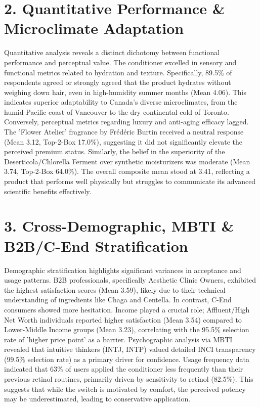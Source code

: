 \documentclass[10pt,twocolumn,a4paper]{article}
\begin{document}
\section{2. Quantitative Performance \& Microclimate Adaptation}
Quantitative analysis reveals a distinct dichotomy between functional performance and perceptual value. The conditioner excelled in sensory and functional metrics related to hydration and texture. Specifically, 89.5\% of respondents agreed or strongly agreed that the product hydrates without weighing down hair, even in high-humidity summer months (Mean 4.06). This indicates superior adaptability to Canada's diverse microclimates, from the humid Pacific coast of Vancouver to the dry continental cold of Toronto. Conversely, perceptual metrics regarding luxury and anti-aging efficacy lagged. The 'Flower Atelier' fragrance by Frédéric Burtin received a neutral response (Mean 3.12, Top-2-Box 17.0\%), suggesting it did not significantly elevate the perceived premium status. Similarly, the belief in the superiority of the Deserticola/Chlorella Ferment over synthetic moisturizers was moderate (Mean 3.74, Top-2-Box 64.0\%). The overall composite mean stood at 3.41, reflecting a product that performs well physically but struggles to communicate its advanced scientific benefits effectively.
\section{3. Cross-Demographic, MBTI \& B2B/C-End Stratification}
Demographic stratification highlights significant variances in acceptance and usage patterns. B2B professionals, specifically Aesthetic Clinic Owners, exhibited the highest satisfaction scores (Mean 3.59), likely due to their technical understanding of ingredients like Chaga and Centella. In contrast, C-End consumers showed more hesitation. Income played a crucial role; Affluent/High Net Worth individuals reported higher satisfaction (Mean 3.54) compared to Lower-Middle Income groups (Mean 3.23), correlating with the 95.5\% selection rate of 'higher price point' as a barrier. Psychographic analysis via MBTI revealed that intuitive thinkers (INTJ, INTP) valued detailed INCI transparency (99.5\% selection rate) as a primary driver for confidence. Usage frequency data indicated that 63\% of users applied the conditioner less frequently than their previous retinol routines, primarily driven by sensitivity to retinol (82.5\%). This suggests that while the switch is motivated by comfort, the perceived potency may be underestimated, leading to conservative application.
\end{document}
